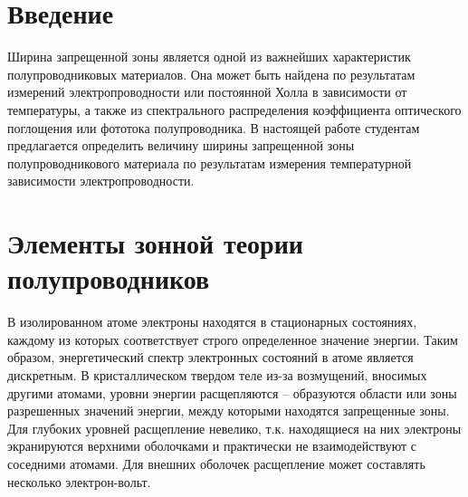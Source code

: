 

\renewcommand{\phi}{\varphi}


	
	\def\labauthors{Есюнин Д.В., Есюнин М.В.}
	\def\labgroup{430}
	\def\labnumber{1}
	\def\labtheme{Измерение ширины запрещенной зоны}
	
	
	
	\newpage
	\section*{Введение}
	Ширина запрещенной зоны является одной из важнейших характеристик полупроводниковых материалов. Она может быть найдена
	по результатам измерений электропроводности или постоянной Холла в зависимости от температуры, а также из спектрального 
	распределения коэффициента оптического поглощения или фототока полупроводника. В настоящей работе студентам предлагается
	определить величину ширины запрещенной зоны полупроводникового материала по результатам измерения температурной зависимости 
	электропроводности. 
	
	\section{Элементы зонной теории полупроводников}
	В изолированном атоме электроны находятся в стационарных состояниях, каждому из которых соответствует строго
	определенное значение энергии. Таким образом, энергетический спектр электронных состояний в атоме является дискретным. В
	кристаллическом твердом теле из-за возмущений, вносимых другими атомами, уровни энергии расщепляются – образуются
	области или зоны разрешенных значений энергии, между которыми находятся запрещенные зоны. Для глубоких уровней
	расщепление невелико, т.к. находящиеся на них электроны экранируются верхними оболочками и практически не
	взаимодействуют с соседними атомами. Для внешних оболочек расщепление может составлять несколько электрон-вольт. 
	
